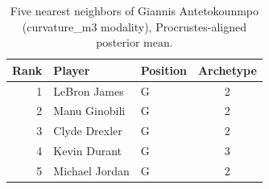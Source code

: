 \begin{table}[htbp]
  \centering\small
  \begin{tabular}{rllc}
    \toprule
    Rank & Player & Position & Archetype \\
    \midrule
    1 & LeBron James & G & 2 \\
    2 & Manu Ginobili & G & 2 \\
    3 & Clyde Drexler & G & 2 \\
    4 & Kevin Durant & G & 3 \\
    5 & Michael Jordan & G & 2 \\
    \bottomrule
  \end{tabular}
  \caption{Five nearest neighbors of Giannis Antetokounmpo (curvature_m3 modality), Procrustes-aligned posterior mean.}
  \label{tab:Giannis_Antetokounmpo_neighbors_curvature_m3}
\end{table}

